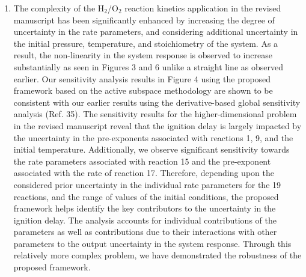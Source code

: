 \documentclass[11pt,final]{article}
\newcommand{\referee}[1]{\vspace{.1ex}\noindent{\textcolor{blue}{#1}}}
\begin{document}
\begin{enumerate}[wide, labelwidth=!, labelindent=0pt]
\item \referee{The authors find that the uncertainty in the ignition delay time is governed
by the uncertainty in H+O~2$<$=$>$~O+OH.
The connection between this reaction and the ignition delay time is so overwhelming that it
is probably responsible for the 1-dimensional active subspace reduction. Once the sensitivity
indices are computed, the one associated with this key reaction is largest.
To a combustion scientist, the fact that ignition delay time (and the uncertainty in the 
ignition delay time when pre-exponentials or activation energies are changed) is governed 
by H+O2~$<$=$>$~O+OH is obvious. This is THE key reaction in combustion kinetics with 10s 
(if not 100s) of studies dedicated to it (from the beginning of the field…). This is textbook k knowledge.
E.g. Figure 4 in Hong et al. (PCI 33, 2011, p. 309-316) shows that, indeed, this is the key 
reaction in sensitivity (by a large margin…). That figure is a "sensitivity analysis" 
which one can accomplish easily.
So, if this is the case, is the authors' reduction framework working because the nonlinear system
is really "simple" in its response to varying parameters}

\noindent The complexity of the H$_2$/O$_2$ reaction kinetics application in the revised manuscript has been significantly
enhanced by increasing the degree of uncertainty in the rate parameters, and considering additional 
uncertainty in the
initial pressure, temperature, and stoichiometry of the system. As a result, the non-linearity in the system
response is observed to increase substantially as seen in Figures 3 and 6 unlike a straight line as 
observed earlier. Our sensitivity analysis results in Figure 4 using the proposed framework based on the
active subspace methodology are shown to be consistent with our earlier results using the derivative-based
global sensitivity analysis (Ref. 35). The sensitivity results for the higher-dimensional problem in the
revised manuscript reveal that the ignition delay is largely impacted by
the uncertainty in the pre-exponents associated with reactions 1, 9, and the initial temperature. Additionally,
we observe significant sensitivity towards the rate parameters associated with reaction 15 and the pre-exponent
associated with the rate of reaction 17. 
Therefore, depending upon the considered prior uncertainty in the individual rate parameters for the 19
reactions, and the range of values of the initial conditions, the proposed framework helps identify the
key contributors to the uncertainty in the ignition delay. The analysis accounts for individual 
contributions of the parameters as well as contributions due to their interactions with other parameters to the 
output uncertainty in the system response. Through this relatively more complex
problem, we have demonstrated the robustness of the proposed framework. 


\end{enumerate}
\end{document}
